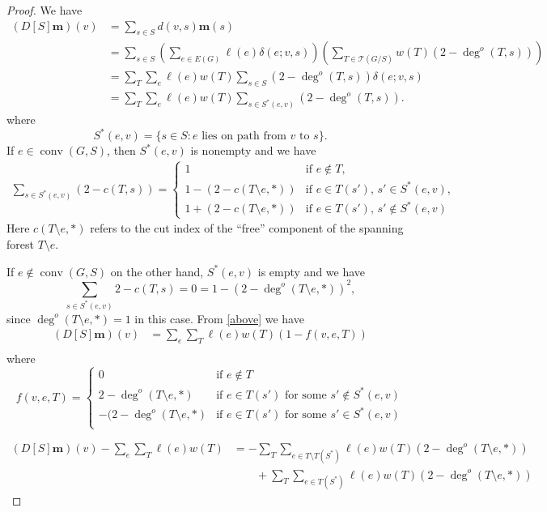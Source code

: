 \documentclass{amsart}
\theoremstyle{definition}
\DeclareMathOperator{\conv}{conv}
\begin{document}
\begin{proof}
We have
\begin{align*}
 (D[S] \mathbf{m})(v) &= \sum_{s \in S} d(v,s) \mathbf{m}(s) \\
 &= \sum_{s \in S} \left( \sum_{e \in E(G)} \ell(e) \delta(e; v,s) \right) \left( \sum_{T \in \mathcal T(G/S)} w(T) (2 - \deg^o(T,s)) \right) \\
 &= \sum_{T } \sum_{e} \ell(e) w(T) \sum_{s \in S} (2 - \deg^o(T, s)) \delta(e; v,s) \\
 &= \sum_{T } \sum_{e} \ell(e) w(T) \sum_{s \in S^*(e,v)} (2 - \deg^o(T, s)) .
\end{align*}
where
$$
S^*(e,v) = \{ s \in S : \text{$e$ lies on path from $v$ to $s$}\}.
$$
If $e \in \conv(G,S)$, then $S^*(e,v)$ is nonempty and we have
\begin{align*}
\sum_{s \in S^*(e,v)}(2 - c(T,s)) = \begin{cases}
1 &\text{if }e \not \in T, \\
1 - (2 - c(T \setminus e, *)) &\text{if } e \in T(s'),\, s'\in S^*(e,v) , \\
1 + (2 - c(T \setminus e, *)) &\text{if } e \in T(s'),\, s' \not\in S^*(e,v)
\end{cases}
\end{align*}
Here $c(T\setminus e, *)$ refers to the cut index of the ``free'' component of the spanning forest $T \setminus e$.

If $e \not\in \conv(G,S)$ on the other hand,
$S^*(e,v)$ is empty and we have
$$ \sum_{s \in S^*(e,v)} 2 - c(T,s) = 0 = 1 - (2 - \deg^o(T\setminus e,*))^2,$$
since $\deg^o(T\setminus e,*) = 1$ in this case. 
From \eqref{above} we have
\begin{align*}
(D[S] \mathbf{m})(v) &= \sum_{e} \sum_{T }  \ell(e) w(T) ( 1 - f(v,e,T) )\\
\end{align*}
where
$$
f(v,e,T) = \begin{cases}
0 &\text{if } e\not\in T\\
2 - \deg^o(T\setminus e,*) &\text{if }  e \in T(s')\text{ for some } s'\not\in S^*(e,v) \\
-(2-\deg^o(T\setminus e,*) &\text{if }  e \in T(s')\text{ for some } s'\in S^*(e,v) \\
\end{cases}
$$

\begin{align*}
(D[S] \mathbf{m})(v) - \sum_{e} \sum_{T }  \ell(e) w(T) 
&= - \sum_T \sum_{e \in T\setminus T(S^*)} \ell(e) w(T) ( 2 - \deg^o(T\setminus e,*)) \\
&\qquad + \sum_T \sum_{e  \in T(S^*)} \ell(e) w(T) (2 - \deg^o(T\setminus e,*) )
\end{align*}


\end{proof}
\end{document}
